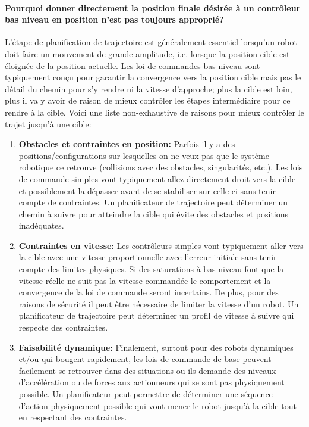 \paragraph{Pourquoi donner directement la position finale désirée à un contrôleur bas niveau en position n'est pas toujours approprié?}
L'étape de planification de trajectoire est généralement essentiel lorsqu'un robot doit faire un mouvement de grande amplitude, i.e. lorsque la position cible est éloignée de la position actuelle. Les loi de commandes bas-niveau sont typiquement conçu pour garantir la convergence vers la position cible mais pas le détail du chemin pour s'y rendre ni la vitesse d'approche; plus la cible est loin, plus il va y avoir de raison de mieux contrôler les étapes intermédiaire pour ce rendre à la cible. Voici une liste non-exhaustive de raisons pour mieux contrôler le trajet jusqu'à une cible:
\begin{enumerate}
    \item \textbf{Obstacles et contraintes en position:} Parfois il y a des positions/configurations sur lesquelles on ne veux pas que le système robotique ce retrouve (collisions avec des obstacles, singularités, etc.). Les lois de commande simples vont typiquement allez directement droit vers la cible et possiblement la dépasser avant de se stabiliser sur celle-ci sans tenir compte de contraintes. Un planificateur de trajectoire peut déterminer un chemin à suivre pour atteindre la cible qui évite des obstacles et positions inadéquates.
    \item \textbf{Contraintes en vitesse:} Les contrôleurs simples vont typiquement aller vers la cible avec une vitesse proportionnelle avec l'erreur initiale sans tenir compte des limites physiques. Si des saturations à bas niveau font que la vitesse réelle ne suit pas la vitesse commandée le comportement et la convergence de la loi de commande seront incertains. De plus, pour des raisons de sécurité il peut être nécessaire de limiter la vitesse d'un robot. Un planificateur de trajectoire peut déterminer un profil de vitesse à suivre qui respecte des contraintes.
    \item \textbf{Faisabilité dynamique:} Finalement, surtout pour des robots dynamiques et/ou qui bougent rapidement, les lois de commande de base peuvent facilement se retrouver dans des situations ou ils demande des niveaux d'accélération ou de forces aux actionneurs qui se sont pas physiquement possible. Un planificateur peut permettre de déterminer une séquence d'action physiquement possible qui vont mener le robot jusqu'à la cible tout en respectant des contraintes.
\end{enumerate}

